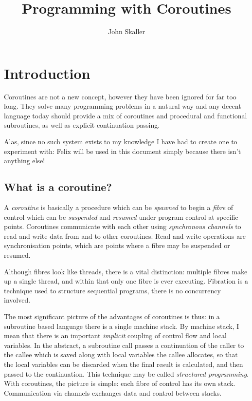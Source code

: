 \documentclass[oneside]{book}
\title{Programming with Coroutines}
\author{John Skaller}
\begin{document}
\maketitle
\tableofcontents
\chapter{Introduction}
Coroutines are not a new concept, however they have been ignored for
far too long. They solve many programming problems in a natural way and
any decent language today should provide a mix of coroutines and procedural
and functional subroutines, as well as explicit continuation passing.

Alas, since no such system exists to my knowledge I have had to create
one to experiment with: Felix will be used in this document simply
because there isn't anything else!

\section{What is a coroutine?}
A {\em coroutine} is basically a procedure which can be {\em spawned} to begin
a {\em fibre} of control which can be {\em suspended} and {\em resumed} under program
control at specific points. Coroutines communicate with each other
using {\em synchronous channels} to read and write data from and to other
coroutines. Read and write operations are synchronisation points,
which are points where a fibre may be suspended or resumed.

Although fibres look like threads, there is a vital distinction: multiple
fibres make up a single thread, and within that only one fibre is ever
executing. Fibration is a technique used to structure sequential programs,
there is no concurrency involved.

The most significant picture of the advantages of coroutines is thus: in a subroutine
based language there is a single machine stack. By machine stack, I mean that
there is an important {\em implicit} coupling of control flow and local variables.
In the abstract, a subroutine call passes a continuation of the caller to 
the callee which is saved along with local variables the callee allocates,
so that the local variables can be discarded when the final result is
calculated, and then passed to the continuation. This technique may be
called {\em structured programming}. With coroutines, the picture is simple:
each fibre of control has its own stack. Communication via channels exchanges data
and control between stacks.
\end{document}
